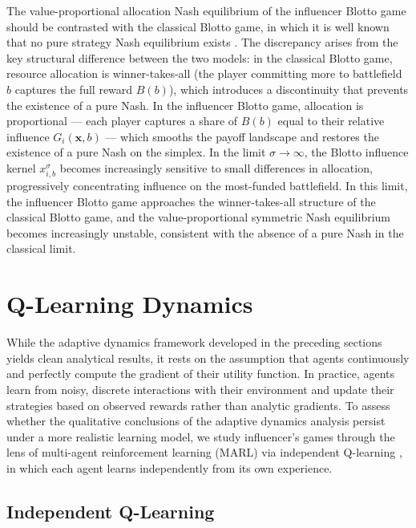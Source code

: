 \documentclass{article}
\begin{document}
        The value-proportional allocation Nash equilibrium of the influencer Blotto game should be contrasted with the classical Blotto game, in which it is well known that no pure strategy Nash equilibrium exists \cite{ roberson2006colonel}.
        The discrepancy arises from the key structural difference between the two models: in the classical Blotto game, resource allocation is winner-takes-all (the player committing more to battlefield $b$ captures the full reward $B(b)$), which introduces a discontinuity that prevents the existence of a pure Nash.
        In the influencer Blotto game, allocation is proportional --- each player captures a share of $B(b)$ equal to their relative influence $G_i(\mathbf{x}, b)$ --- which smooths the payoff landscape and restores the existence of a pure Nash on the simplex.
        In the limit $\sigma \to \infty$, the Blotto influence kernel $x_{i,b}^\sigma$ becomes increasingly sensitive to small differences in allocation, progressively concentrating influence on the most-funded battlefield.
        In this limit, the influencer Blotto game approaches the winner-takes-all structure of the classical Blotto game, and the value-proportional symmetric Nash equilibrium becomes increasingly unstable, consistent with the absence of a pure Nash in the classical limit.
   


    \section{Q-Learning Dynamics}\label{sec:SI_qlearning}

        While the adaptive dynamics framework developed in the preceding sections yields clean analytical results, it rests on the assumption that agents continuously and perfectly compute the gradient of their utility function. In practice, agents learn from noisy, discrete interactions with their environment and update their strategies based on observed rewards rather than analytic gradients. To assess whether the qualitative conclusions of the adaptive dynamics analysis persist under a more realistic learning model, we study influencer's games through the lens of multi-agent reinforcement learning (MARL) via independent Q-learning \cite{watkins1992q,tan1993multi,matignon2012independent}, in which each agent learns independently from its own experience.

        \subsection{Independent Q-Learning}\label{subsec:SI_iql}
\end{document}
